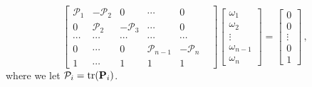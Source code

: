 \documentclass[letterpaper, 10 pt, conference]{ieeeconf}  %
\providecommand{\DIFaddbegin}{} %
\providecommand{\DIFaddend}{} %
\providecommand{\DIFdelbegin}{} %
\providecommand{\DIFdelend}{} %
\begin{document}
\begin{equation}
   \DIFdelbegin %
\DIFdelend \DIFaddbegin \begin{bmatrix}
      \mathcal{P}_1 & -\mathcal{P}_2 & 0 & \cdots & 0 \\
      0 & \mathcal{P}_2 & -\mathcal{P}_3 & \cdots & 0 \\
      \cdots & \cdots & \cdots & \cdots & \cdots & \\
      0 & \cdots & 0 & \mathcal{P}_{n-1} & -\mathcal{P}_{n} \\
      1 & \cdots & 1 & 1 & 1 &
   \end{bmatrix}\DIFaddend 
   \DIFdelbegin %
\DIFdelend \DIFaddbegin \begin{bmatrix}
      \omega_1 \\
      \omega_2 \\
      \vdots \\
      \omega_{n-1} \\
      \omega_{n}
   \end{bmatrix}\DIFaddend 
   =
   \begin{bmatrix}
      0 \\
      0 \\
      \vdots \\
      0 \\
      1
   \end{bmatrix}\,, \label{eqn:fci_eq_sys}
\end{equation}
where we let $\mathcal{P}_i = \operatorname{tr}({{\mathbf{P}}}_i)$.
\end{document}
